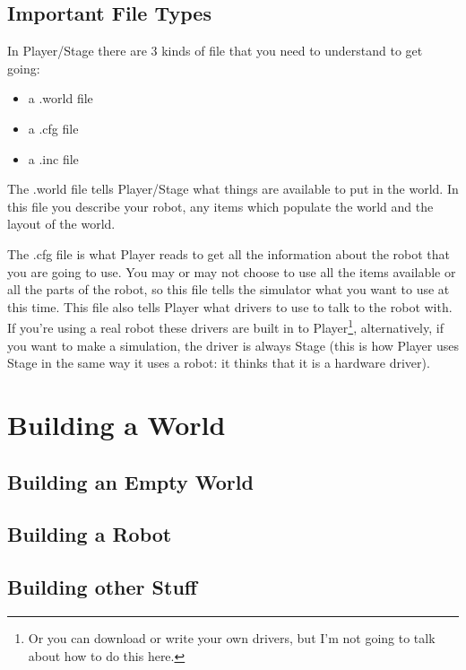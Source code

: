 \documentclass{article}
\begin{document}
\subsection{Important File Types}
In Player/Stage there are 3 kinds of file that you need to understand to get going:
\begin{itemize}
\item a .world file
\item a .cfg file
\item a .inc file
\end{itemize}
The .world file tells Player/Stage what things are available to put in the world. In this file you describe your robot, any items which populate the world and the layout of the world.

The .cfg file is what Player reads to get all the information about the robot that you are going to use. You may or may not choose to use all the items available or all the parts of the robot, so this file tells the simulator what you want to use at this time. This file also tells Player what drivers to use to talk to the robot with. If you're using a real robot these drivers are built in to Player\footnote{Or you can download or write your own drivers, but I'm not going to talk about how to do this here.}, alternatively, if you want to make a simulation, the driver is always Stage (this is how Player uses Stage in the same way it uses a robot: it thinks that it is a hardware driver).









\section{Building a World}

\subsection{Building an Empty World}

\subsection{Building a Robot}

\subsection{Building other Stuff}













\begin{thebibliography}

\end{thebibliography}
\end{document}
